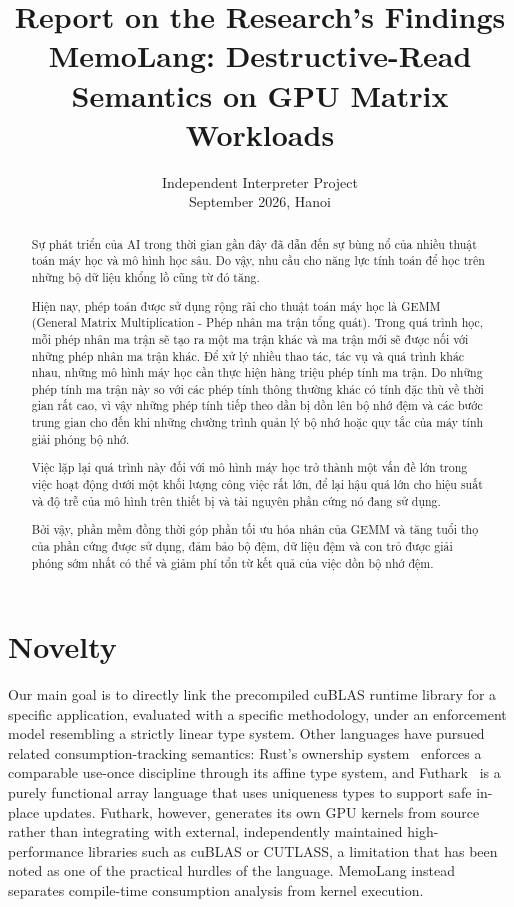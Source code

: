 \documentclass[a4paper]{article}
\renewcommand{\normalsize}{\fontsize{13pt}{15.6pt}\selectfont}
\begin{document}
\title{Report on the Research's Findings \\
{\large MemoLang: Destructive-Read Semantics on GPU Matrix Workloads}}

\author{
Independent Interpreter Project\\
September 2026, Hanoi}

\maketitle

\begin{abstract}
\normalsize
Sự phát triển của AI trong thời gian gần đây đã dẫn đến sự bùng nổ của nhiều thuật toán máy học và mô hình học sâu. Do vậy, nhu 
cầu cho năng lực tính toán để học trên những bộ dữ liệu khổng lồ
cũng từ đó tăng.

Hiện nay, phép toán được sử dụng rộng rãi cho thuật toán máy học là GEMM (General Matrix Multiplication - Phép nhân ma trận tổng 
quát). Trong quá trình học, mỗi phép nhân ma trận sẽ tạo ra một ma trận khác và ma trận mới sẽ được nối với những phép nhân ma trận khác. Để xử lý nhiều thao tác, tác vụ và quá trình khác nhau, những mô hình máy học cần thực hiện hàng triệu phép tính ma trận. Do những phép tính ma trận này so với các phép tính thông thường khác có tính đặc thù về thời gian rất cao, vì vậy những phép tính tiếp theo dần bị dồn lên bộ nhớ đệm và các bước trung gian cho đến khi những chường trình quản lý bộ nhớ hoặc quy tắc của máy tính giải phóng bộ nhớ.

Việc lặp lại quá trình này đối với mô hình máy học trở thành một vấn đề lớn trong việc hoạt động dưới một khối lượng công việc rất lớn, để lại hậu quá lớn cho hiệu suất và độ trễ của mô hình trên thiết bị và tài nguyên phần cứng nó đang sử dụng.

Bởi vậy, phần mềm đồng thời góp phần tối ưu hóa nhân của GEMM và tăng tuổi thọ của phần cứng được sử dụng, đảm bảo bộ đệm, dữ liệu đệm và con trỏ được giải phóng sớm nhất có thể và giảm phí tổn từ kết quả của việc dồn bộ nhớ đệm.
\end{abstract}


\section{Novelty}

Our main goal is to directly link the precompiled cuBLAS runtime library for a specific application, evaluated with a specific methodology, under an enforcement model resembling a strictly linear type system. Other languages have pursued related consumption-tracking semantics: Rust's ownership system~\cite{rust} enforces a comparable use-once discipline through its affine type system, and Futhark~\cite{futhark} is a purely functional array language that uses uniqueness types to support safe in-place updates. Futhark, however, generates its own GPU kernels from source rather than integrating with external, independently maintained high-performance libraries such as cuBLAS or CUTLASS, a limitation that has been noted as one of the practical hurdles of the language. MemoLang instead separates compile-time consumption analysis from kernel execution.
\end{document}
